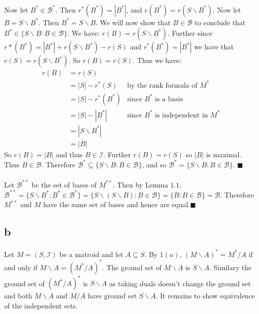 \documentclass[letterpaper,12pt,oneside,onecolumn]{report}
\begin{document}
\paragraph{}
Now let $B^* \in \mathcal{B}^*$. Then $r^*(B^*) = |B^*|$, and $r(B^*) = r(S\backslash B^*)$. Now let $B = S\backslash B^*$. Then $B^* = S\backslash B$. We will now show that $B \in \mathcal{B}$ to conclude that $B^* \in \{S\backslash B : B \in \mathcal{B}\}$. We have: $r(B) = r(S\backslash B^*)$. Further since $r*(B^*) = |B^*| + r(S\backslash B^*) - r(S)$ and $r^*(B^*) = |B^*|$ we have that $r(S) = r(S\backslash B^*)$. So $r(B) = r(S)$. Thus we have:
\begin{align*}
r(B) &= r(S) \\
&= |S| - r^*(S) &\text{by the rank formula of $M^*$}\\
&= |S| - r^*(B^*) &\text{since $B^*$ is a basis}\\
&= |S| - |B^*| &\text{since $B^*$ is independent in $M^*$}\\
&= |S\backslash B^*| \\
&= |B|
\end{align*}
So $r(B) = |B|$ and thus $B \in \mathcal{I}$. Further $r(B) = r(S)$ so $|B|$ is maximal. Thus $B \in \mathcal{B}$. Therefore $\mathcal{B}^* \subseteq \{S\backslash B : B \in \mathcal{B}\}$, and so $\mathcal{B}^* = \{S\backslash B : B \in \mathcal{B}\}$. $\blacksquare$
\paragraph{}
Let $\mathcal{B}^{**}$ be the set of bases of $M^{**}$. Then by Lemma $1.1$, $\mathcal{B}^{**} = \{S\backslash B^* : B^* \in \mathcal{B}^*\} = \{S\backslash (S\backslash B): B \in \mathcal{B} \} = \{B : B \in \mathcal{B} \} = \mathcal{B}$. Therefore $M^{**}$ and $M$ have the same set of bases and hence are equal.$\blacksquare$
\subsection*{b}
\paragraph{}
Let $M = (S,\mathcal{I})$ be a matroid and let $A \subseteq S$. By $1(a)$, $(M \backslash A)^* = M^*/A$ if and only if $M \backslash A = (M^*/A)^*$. The ground set of $M\backslash A$ is $S\backslash A$. Similary the ground set of $(M^*/A)^*$ is $S\backslash A$ as taking duals doesn't change the ground set and both $M\backslash A$ and $M/A$ have ground set $S\backslash A$. It remains to show equivalence of the independent sets.
\end{document}
